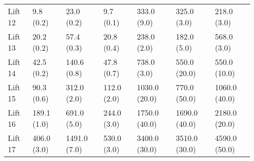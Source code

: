 \begin{tabular}{lllllll}
Lift 12 &         9.8 (0.2) &            23.0 (0.2) &          9.7 (0.1) &             333.0 (9.0) &                 325.0 (3.0) &              218.0 (3.0) \\
Lift 13 &        20.2 (0.2) &            57.4 (0.3) &         20.8 (0.4) &             238.0 (2.0) &                 182.0 (5.0) &              568.0 (3.0) \\
Lift 14 &        42.5 (0.2) &           140.6 (0.8) &         47.8 (0.7) &             738.0 (3.0) &                550.0 (20.0) &             550.0 (10.0) \\
Lift 15 &        90.3 (0.6) &           312.0 (2.0) &        112.0 (2.0) &           1030.0 (20.0) &                770.0 (50.0) &            1060.0 (40.0) \\
Lift 16 &       189.1 (1.0) &           691.0 (5.0) &        244.0 (3.0) &           1750.0 (40.0) &               1690.0 (40.0) &            2180.0 (20.0) \\
Lift 17 &       406.0 (3.0) &          1491.0 (7.0) &        530.0 (3.0) &           3400.0 (30.0) &               3510.0 (30.0) &            4590.0 (50.0) \\
\bottomrule
\end{tabular}
